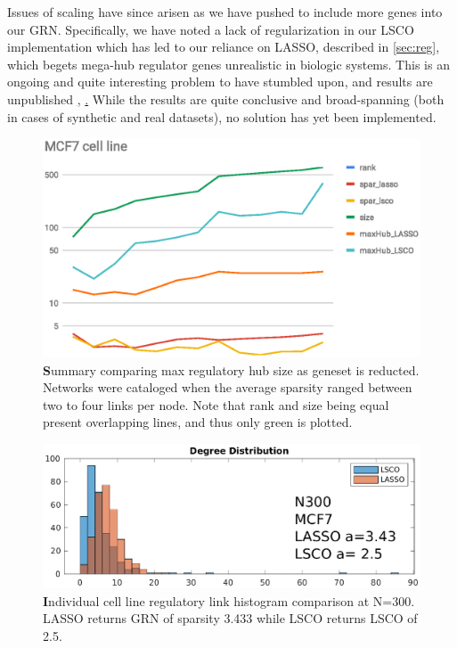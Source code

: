 Issues of scaling have since arisen as we have pushed to include more genes into our GRN. Specifically, we have noted a lack of regularization in our LSCO implementation which has led to our reliance on LASSO, described in \cref{sec:reg}, which begets mega-hub regulator genes unrealistic in biologic systems. This is an ongoing and quite interesting problem to have stumbled upon, and results are unpublished \href{fig:scaling}, \href{fig:hubiness}. While the results are quite conclusive and broad-spanning (both in cases of synthetic and real datasets), no solution has yet been implemented.
\begin{figure}[H]
\centering
\includegraphics[width=.75\linewidth]{3/MCF7_cell_line.eps}
\caption{{\textbf Summary comparing max regulatory hub size as geneset is reducted.} Networks were cataloged when the average sparsity ranged between two to four links per node. Note that rank and size being equal present overlapping lines, and thus only green is plotted.
}
\label{fig:scaling}
\end{figure}

\begin{figure}[H]
\centering
\includegraphics[width=.75\linewidth]{3/hubineess.eps}
\caption{{\textbf Individual cell line regulatory link histogram comparison at N=300}. LASSO returns GRN of sparsity 3.433 while LSCO returns LSCO of 2.5.
}
\label{fig:hubiness}
\end{figure}




